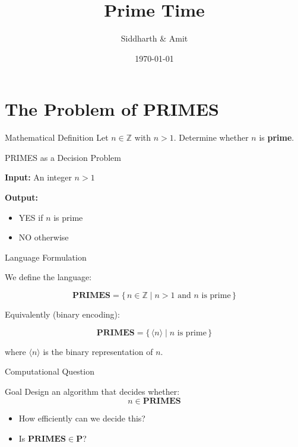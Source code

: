 \documentclass{beamer}
\title{Prime Time}
\author{Siddharth \& Amit}
\date{\today}
\begin{document}
\frame{\titlepage}

\section{The Problem of PRIMES}

\begin{frame}{Mathematical Definition}
    Let $n \in \mathbb{Z}$ with $n > 1$. Determine whether $n$ is \textbf{prime}.
\end{frame}

\begin{frame}{PRIMES as a Decision Problem}

\textbf{Input:} An integer $n > 1$

\textbf{Output:}
\begin{itemize}
    \item YES if $n$ is prime
    \item NO otherwise
\end{itemize}

\end{frame}

\begin{frame}{Language Formulation}

We define the language:

\[
\textbf{PRIMES} = \{\, n \in \mathbb{Z} \mid n > 1 \text{ and } n \text{ is prime} \,\}
\]

Equivalently (binary encoding):

\[
\textbf{PRIMES} = \{\, \langle n \rangle \mid n \text{ is prime} \,\}
\]

where $\langle n \rangle$ is the binary representation of $n$.

\end{frame}

\begin{frame}{Computational Question}

\begin{block}{Goal}
Design an algorithm that decides whether:
\[
n \in \textbf{PRIMES}
\]
\end{block}

\pause

\begin{itemize}
    \item How efficiently can we decide this?
    \item Is $\textbf{PRIMES} \in \mathbf{P}$?
\end{itemize}

\end{frame}
\end{document}
